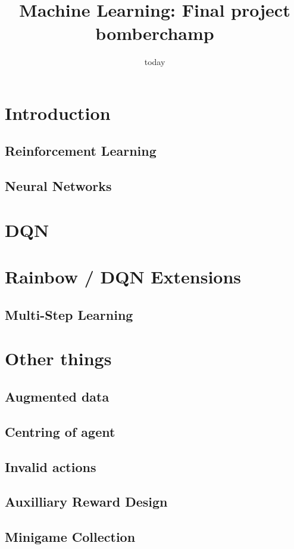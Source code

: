 \documentclass[12pt]{article}
\title{Machine Learning: Final project bomberchamp}
\date{today}
\begin{document}
\section{Introduction}

\subsection{Reinforcement Learning}

\subsection{Neural Networks}

\section{DQN}

\section{Rainbow / DQN Extensions}

\subsection{Multi-Step Learning} %
% 


\section{Other things}
\subsection{Augmented data}
\subsection{Centring of agent} %
\subsection{Invalid actions} %
\subsection{Auxilliary Reward Design}
\subsection{Minigame Collection} %
\end{document}

